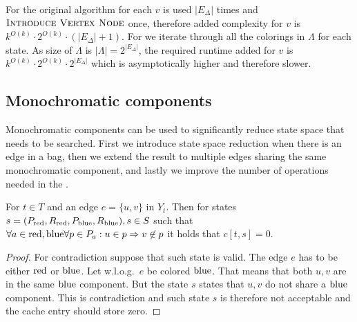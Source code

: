 For the original algorithm for each \( v \)
\IntroduceEdgeNode{} is used \( |E_\Delta| \) times
and \( \textsc{Introduce Vertex Node}{} \) once, therefore added complexity for \( v \)
is \( {k}^{O(k)} \cdot 2^{O(k)} \cdot (|E_\Delta| + 1) \).
%
For \IntroduceVertexWithEdgesNode{} we iterate
through all the colorings in \( \Lambda \) for each state.
As size of \( \Lambda \) is \( |\Lambda| = 2^|E_\Delta| \),
the required runtime added for \( v \) is
\( {k}^{O(k)} \cdot 2^{O(k)} \cdot 2^{|E_\Delta|}\)
which is asymptotically higher and therefore slower.

\subsection{Monochromatic components}

Monochromatic components can be used to significantly reduce state space
that needs to be searched. First we introduce state space reduction when
there is an edge in a bag, then we extend the result to multiple edges
sharing the same monochromatic component, and lastly we improve the number of
operations needed in the \IntroduceVertexNode{}.
%
\begin{theorem}
	For \( t \in T \) and an edge \( e = \{u, v\} \) in \( Y_t \).
	Then for states \( s = (P_{\text{red}}, R_{\text{red}}, P_{\text{blue}}, R_{\text{blue}}), s \in S \) such that
	\( \forall a \in {\text{red}, \text{blue}} \forall p \in P_a : u \in p \Rightarrow v \not\in p \)
	it holds that \( c[t, s] = 0 \).
\end{theorem}
%
%
\begin{proof}
	For contradiction suppose that such state is valid. The edge \( e \)
	has to be either \( \text{red} \) or \( \text{blue} \). Let w.l.o.g.\ \( e \) be colored \( \text{blue} \).
	That means that both \( u, v \) are in the same \( \text{blue} \) component.
	But the state \( s \) states that \( u, v \) do not share a \( \text{blue} \) component.
	This is contradiction and such state \( s \) is therefore not acceptable
	and the cache entry should store zero.
\end{proof}
%

